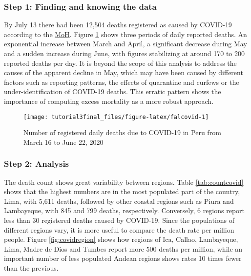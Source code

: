 \documentclass[
]{article}
\begin{document}
\hypertarget{step-1-finding-and-knowing-the-data-3}{%
\subsubsection{Step 1: Finding and knowing the data}\label{step-1-finding-and-knowing-the-data-3}}

By July 13 there had been 12,504 deaths registered as caused by COVID-19 according to the \href{https://covid19.minsa.gob.pe/sala_situacional.asp}{MoH}. Figure \ref{fig:falcovid} shows three periods of daily reported deaths. An exponential increase between March and April, a significant decrease during May and a sudden increase during June, with figures stabilizing at around 170 to 200 reported deaths per day. It is beyond the scope of this analysis to address the causes of the apparent decline in May, which may have been caused by different factors such as reporting patterns, the effects of quarantine and curfews or the under-identification of COVID-19 deaths. This erratic pattern shows the importance of computing excess mortality as a more robust approach.

\begin{figure}[H]

{\centering \texttt{[image: tutorial3final\_files/figure-latex/falcovid-1]} 

}

\caption{Number of registered daily deaths due to COVID-19 in Peru from March 16 to June 22, 2020}\label{fig:falcovid}
\end{figure}

\hypertarget{step-2-analysis}{%
\subsubsection{Step 2: Analysis}\label{step-2-analysis}}

The death count shows great variability between regions. Table \ref{tab:countcovid} shows that the highest numbers are in the most populated part of the country, Lima, with 5,611 deaths, followed by other coastal regions such as Piura and Lambayeque, with 845 and 799 deaths, respectively. Conversely, 6 regions report less than 30 registered deaths caused by COVID-19. Since the populations of different regions vary, it is more useful to compare the death rate per million people. Figure \ref{fig:covidregion} shows how regions of Ica, Callao, Lambayeque, Lima, Madre de Dios and Tumbes report more 500 deaths per million, while an important number of less populated Andean regions shows rates 10 times fewer than the previous.
\end{document}
